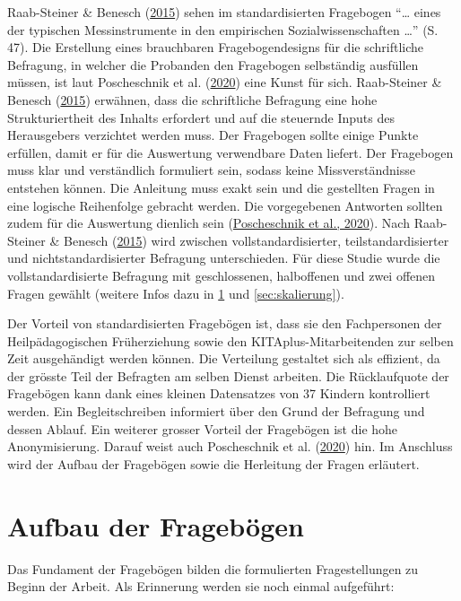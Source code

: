 \documentclass[
  ngerman,
  11pt,
  paper=a4,
  twoside,
  titlepage=true,
  openright,
  abstract=on,
  toc=listofnumbered,
  numbers=noenddot,
  chapterprefix=true,
  headings=optiontohead,
  svgnames,
  dvipsnames]{scrreprt}
\begin{document}
Raab-Steiner \& Benesch (\protect\hyperlink{ref-raabsteiner}{2015})
sehen im standardisierten Fragebogen “… eines der typischen
Messinstrumente in den empirischen Sozialwissenschaften …” (S. 47). Die
Erstellung eines brauchbaren Fragebogendesigns für die schriftliche
Befragung, in welcher die Probanden den Fragebogen selbständig ausfüllen
müssen, ist laut Poscheschnik et al.
(\protect\hyperlink{ref-hug2020}{2020}) eine Kunst für sich.
Raab-Steiner \& Benesch (\protect\hyperlink{ref-raabsteiner}{2015})
erwähnen, dass die schriftliche Befragung eine hohe Strukturiertheit des
Inhalts erfordert und auf die steuernde Inputs des Herausgebers
verzichtet werden muss. Der Fragebogen sollte einige Punkte erfüllen,
damit er für die Auswertung verwendbare Daten liefert. Der Fragebogen
muss klar und verständlich formuliert sein, sodass keine
Missverständnisse entstehen können. Die Anleitung muss exakt sein und
die gestellten Fragen in eine logische Reihenfolge gebracht werden. Die
vorgegebenen Antworten sollten zudem für die Auswertung dienlich sein
(\protect\hyperlink{ref-hug2020}{Poscheschnik et al., 2020}). Nach
Raab-Steiner \& Benesch (\protect\hyperlink{ref-raabsteiner}{2015}) wird
zwischen vollstandardisierter, teilstandardisierter und
nichtstandardisierter Befragung unterschieden. Für diese Studie wurde
die vollstandardisierte Befragung mit geschlossenen, halboffenen und
zwei offenen Fragen gewählt (weitere Infos dazu in \cref{sec:fragebogen}
und \cref{sec:skalierung}).

Der Vorteil von standardisierten Fragebögen ist, dass sie den
Fachpersonen der Heilpädagogischen Früherziehung sowie den
KITAplus-Mitarbeitenden zur selben Zeit ausgehändigt werden können. Die
Verteilung gestaltet sich als effizient, da der grösste Teil der
Befragten am selben Dienst arbeiten. Die Rücklaufquote der Fragebögen
kann dank eines kleinen Datensatzes von 37 Kindern kontrolliert werden.
Ein Begleitschreiben informiert über den Grund der Befragung und dessen
Ablauf. Ein weiterer grosser Vorteil der Fragebögen ist die hohe
Anonymisierung. Darauf weist auch Poscheschnik et al.
(\protect\hyperlink{ref-hug2020}{2020}) hin. Im Anschluss wird der
Aufbau der Fragebögen sowie die Herleitung der Fragen erläutert.

\hypertarget{sec:fragebogen}{%
\section{Aufbau der Fragebögen}\label{sec:fragebogen}}

Das Fundament der Fragebögen bilden die formulierten Fragestellungen zu
Beginn der Arbeit. Als Erinnerung werden sie noch einmal aufgeführt:
\end{document}
